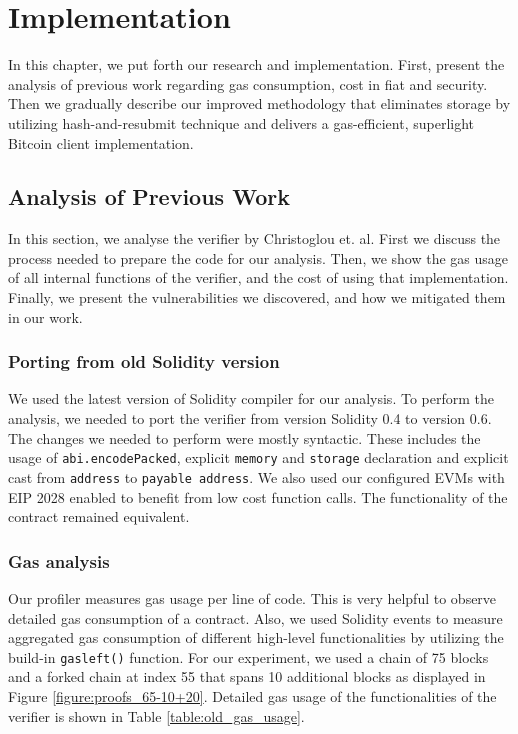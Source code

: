 \chapter{Implementation}

In this chapter, we put forth our research and implementation. First, present
the analysis of previous work regarding gas consumption, cost in fiat and
security. Then we gradually describe our improved methodology that eliminates
storage by utilizing hash-and-resubmit technique and delivers a gas-efficient,
superlight Bitcoin client implementation. 

\section{Analysis of Previous Work}

In this section, we analyse the verifier by Christoglou et. al. First we
discuss the process needed to prepare the code for our analysis. Then, we show
the gas usage of all internal functions of the verifier, and the cost of using
that implementation. Finally, we present the vulnerabilities we discovered, and
how we mitigated them in our work.

\subsection{Porting from old Solidity version}

We used the latest version of Solidity compiler for our analysis. To perform
the analysis, we needed to port the verifier from version Solidity 0.4 to
version 0.6.  The changes we needed to perform were mostly syntactic. These
includes the usage of \texttt{abi.encodePacked}, explicit \texttt{memory} and
\texttt{storage} declaration and explicit cast from \texttt{address} to
\texttt{payable address}. We also used our configured EVMs with EIP 2028
enabled to benefit from low cost function calls. The functionality of the
contract remained equivalent.

\subsection{Gas analysis}

Our profiler measures gas usage per line of code. This is very helpful to
observe detailed gas consumption of a contract. Also, we used Solidity events
to measure aggregated gas consumption of different high-level functionalities
by utilizing the build-in \texttt{gasleft()} function. For our experiment, we
used a chain of 75 blocks and a forked chain at index 55 that spans 10
additional blocks as displayed in Figure \ref{figure:proofs_65-10+20}. Detailed
gas usage of the functionalities of the verifier is shown in Table
\ref{table:old_gas_usage}.

